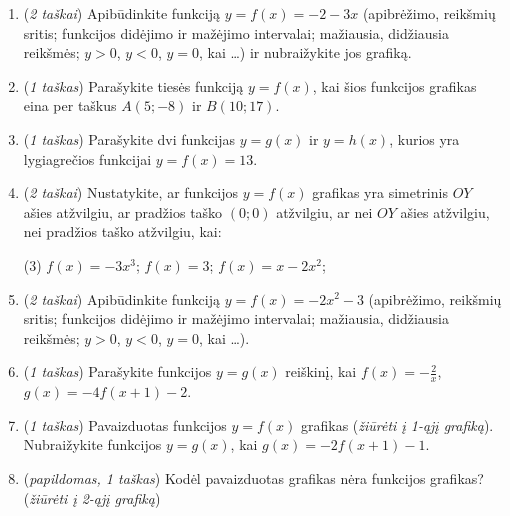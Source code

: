 \documentclass[a4paper]{article}
\begin{document}
\begin{minipage}[t]{0.65\textwidth}
      \vspace*{-50mm} %
      \begin{enumerate}[itemsep=2mm, parsep=1mm, start=2]
            \item (\textit{2 taškai}) Apibūdinkite funkciją $y=f(x)=-2-3x$ (apibrėžimo, reikšmių
                  sritis;
                  funkcijos didėjimo ir mažėjimo intervalai; mažiausia,
                  didžiausia
                  reikšmės; $y>0$, $y<0$, $y=0$, kai \ldots) ir nubraižykite
                  jos
                  grafiką.

            \item (\textit{1 taškas}) Parašykite tiesės funkciją $y=f(x)$, kai šios funkcijos
                  grafikas
                  eina per taškus $A(5; -8)$ ir $B(10; 17)$.

            \item (\textit{1 taškas}) Parašykite dvi funkcijas $y=g(x)$ ir $y=h(x)$, kurios yra
                  lygiagrečios funkcijai $y=f(x)=13$.

            \item (\textit{2 taškai}) Nustatykite, ar funkcijos $y=f(x)$ grafikas yra simetrinis
                  $OY$
                  ašies atžvilgiu, ar pradžios taško $(0; 0)$ atžvilgiu, ar nei
                  $OY$
                  ašies atžvilgiu, nei pradžios taško atžvilgiu, kai:

                  \begin{tasks}[item-format={\normalfont},
                              after-item-skip=2mm](3)
                        \task $f(x)=-3x^3$;
                        \task $f(x)=3$;
                        \task $f(x)=x-2x^2$;
                  \end{tasks}

            \item (\textit{2 taškai}) Apibūdinkite funkciją $y=f(x)=-2x^2-3$ (apibrėžimo, reikšmių
                  sritis;
                  funkcijos didėjimo ir mažėjimo intervalai; mažiausia,
                  didžiausia
                  reikšmės; $y>0$, $y<0$, $y=0$, kai \ldots).

            \item (\textit{1 taškas}) Parašykite funkcijos $y=g(x)$ reiškinį, kai
                  $f(x)=-\frac{2}{x}$,
                  $g(x)=-4f(x+1)-2$.

            \item (\textit{1 taškas}) Pavaizduotas funkcijos $y=f(x)$ grafikas (\textit{žiūrėti į 1-ąjį grafiką}). Nubraižykite
                  funkcijos
                  $y=g(x)$, kai $g(x)=-2f(x+1)-1$.

            \item (\textit{papildomas, 1 taškas}) Kodėl pavaizduotas grafikas
                  nėra funkcijos grafikas? (\textit{žiūrėti į 2-ąjį grafiką})
      \end{enumerate}
\end{minipage}
\end{document}
